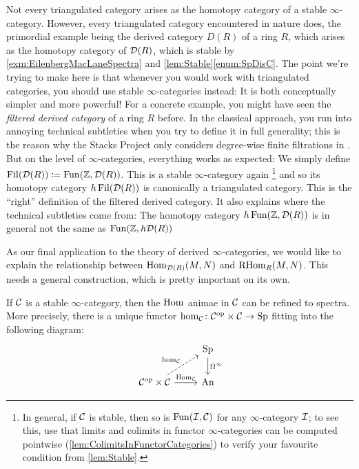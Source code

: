 \begin{numpar}
	Not every triangulated category arises as the homotopy category of a stable $\infty$-category. However, every triangulated category encountered in nature does, the primordial example being the derived category $D(R)$ of a ring $R$, which arises as the homotopy category of $\mathcal{D}(R)$, which is stable by \cref{exm:EilenbergMacLaneSpectra} and \cref{lem:Stable}\cref{enum:SpDisC}. The point we're trying to make here is that whenever you would work with triangulated categories, you should use stable $\infty$-categories instead: It is both conceptually simpler and more powerful! For a concrete example, you might have seen the \emph{filtered derived category} of a ring $R$ before. In the classical approach, you run into annoying technical subtleties when you try to define it in full generality; this is the reason why the Stacks Project only considers degree-wise finite filtrations in \cite[]{Stacks}. But on the level of $\infty$-categories, everything works as expected: We simply define $\operatorname{Fil}(\mathcal{D}(R))\coloneqq \operatorname{Fun}(\mathbb{Z},\mathcal{D}(R))$. This is a stable $\infty$-category again%
	\footnote{In general, if $\mathcal{C}$ is stable, then so is $\operatorname{Fun}(\mathcal{I},\mathcal{C})$ for any $\infty$-category $\mathcal{I}$; to see this, use that limits and colimits in functor $\infty$-categories can be computed pointwise (\cref{lem:ColimitsInFunctorCategories}) to verify your favourite condition from \cref{lem:Stable}.}
	and so its homotopy category $h\operatorname{Fil}(\mathcal{D}(R))$ is canonically a triangulated category. This is the \enquote{right} definition of the filtered derived category. It also explains where the technical subtleties come from: The homotopy category $h\operatorname{Fun}(\mathbb{Z},\mathcal{D}(R))$ is in general not the same as $\operatorname{Fun}(\mathbb{Z},h\mathcal{D}(R))$
\end{numpar}
As our final application to the theory of derived $\infty$-categories, we would like to explain the relationship between $\operatorname{Hom}_{\mathcal{D}(R)}(M,N)$ and $\operatorname{RHom}_R(M,N)$. This needs a general construction, which is pretty important on its own.
\begin{lem}\label{cor:hom}
	If $\mathcal{C}$ is a stable $\infty$-category, then the $\operatorname{Hom}$ animae in $\mathcal{C}$ can be refined to spectra. More precisely, there is a unique  functor $\hom_{\mathcal{C}}\colon \mathcal{C}^{\mathrm{op}}\times\mathcal{C}\rightarrow\mathrm{Sp}$ fitting into the following diagram:
	\begin{equation*}
		\begin{tikzcd}
			& \cat{Sp}\dar["\Omega^\infty"]\\
			\Cc^\op\times\Cc\urar[dashed,"\hom_\Cc"]\rar["\Hom_\Cc"] & \cat{An} 
		\end{tikzcd}
	\end{equation*}
\end{lem}
